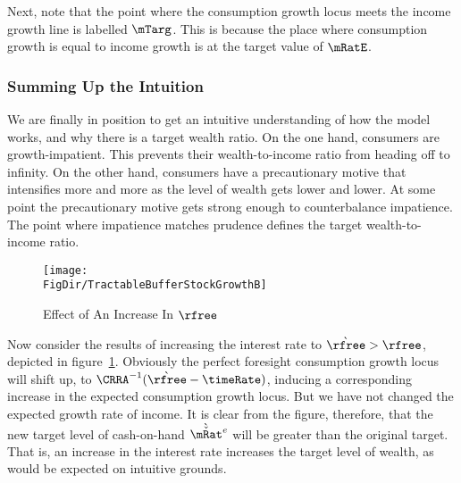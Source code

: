 \documentclass{\handout}
\begin{document}
Next, note that the point where the consumption growth locus
meets the income growth line is labelled $\mTarg^{\null}$.  This is
because the place where consumption growth is equal to income
growth is at the target value of $\mRatE$.



\subsubsection{Summing Up the Intuition}
We are finally in position to get an intuitive understanding of how the
model works, and why there is a target wealth ratio.  On the one hand,
consumers are growth-impatient.  This prevents their wealth-to-income ratio
from heading off to infinity.  On the other hand, consumers have
a precautionary motive that intensifies more and more as the level of
wealth gets lower and lower.  At some point the precautionary motive
gets strong enough to counterbalance impatience.  The point where impatience matches prudence defines the
target wealth-to-income ratio.


\begin{figure}
\caption{Effect of An Increase In $\rfree$}
\texttt{[image: \\FigDir/TractableBufferStockGrowthB]}
\label{fig:GrowthB}
\end{figure}

Now consider the results of increasing the interest rate to
$\grave{\rfree}>\rfree$, depicted in figure~\ref{fig:GrowthB}.  Obviously the perfect foresight consumption
growth locus will shift up, to $\CRRA^{-1}(\grave{\rfree}-\timeRate)$,
inducing a corresponding increase in the expected consumption growth
locus.  But we have not changed the expected growth rate of income.
It is clear from the figure, therefore, that the new target level of
cash-on-hand $\grave{\check{\mRat}}^{e}$ will be greater than the original target.
That is, an increase in the interest rate increases the target level
of wealth, as would be expected on intuitive grounds.
\end{document}

